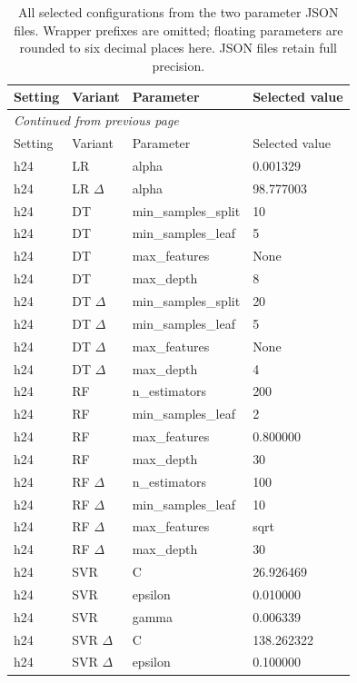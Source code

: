 \begingroup\small\setlength{\tabcolsep}{4pt}
\begin{longtable}{lp{.20\linewidth}p{.32\linewidth}l}
\caption{All selected configurations from the two parameter JSON files. Wrapper prefixes are omitted; floating parameters are rounded to six decimal places here. JSON files retain full precision.}\label{tab:parameters}\\
\toprule
Setting & Variant & Parameter & Selected value \\
\midrule\endfirsthead
\multicolumn{4}{l}{\small\itshape Continued from previous page}\\\toprule
Setting & Variant & Parameter & Selected value \\
\midrule\endhead\bottomrule\endfoot
h24 & LR & alpha & \num{0.001329} \\
h24 & LR $\Delta$ & alpha & \num{98.777003} \\
h24 & DT & min\_samples\_split & 10 \\
h24 & DT & min\_samples\_leaf & 5 \\
h24 & DT & max\_features & None \\
h24 & DT & max\_depth & 8 \\
h24 & DT $\Delta$ & min\_samples\_split & 20 \\
h24 & DT $\Delta$ & min\_samples\_leaf & 5 \\
h24 & DT $\Delta$ & max\_features & None \\
h24 & DT $\Delta$ & max\_depth & 4 \\
h24 & RF & n\_estimators & 200 \\
h24 & RF & min\_samples\_leaf & 2 \\
h24 & RF & max\_features & \num{0.800000} \\
h24 & RF & max\_depth & 30 \\
h24 & RF $\Delta$ & n\_estimators & 100 \\
h24 & RF $\Delta$ & min\_samples\_leaf & 10 \\
h24 & RF $\Delta$ & max\_features & sqrt \\
h24 & RF $\Delta$ & max\_depth & 30 \\
h24 & SVR & C & \num{26.926469} \\
h24 & SVR & epsilon & \num{0.010000} \\
h24 & SVR & gamma & \num{0.006339} \\
h24 & SVR $\Delta$ & C & \num{138.262322} \\
h24 & SVR $\Delta$ & epsilon & \num{0.100000} \\

\end{longtable}
